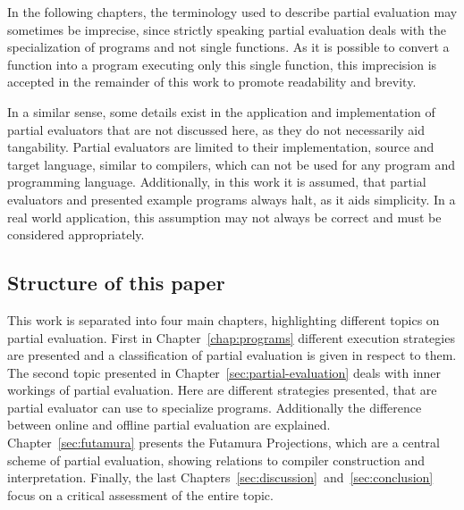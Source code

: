 In the following chapters, the terminology used to describe partial evaluation may sometimes be imprecise, since strictly speaking partial evaluation deals with the specialization of programs and not single functions.
As it is possible to convert a function into a program executing only this single function, this imprecision is accepted in the remainder of this work to promote readability and brevity.

In a similar sense, some details exist in the application and implementation of partial evaluators that are not discussed here, as they do not necessarily aid tangability.
Partial evaluators are limited to their implementation, source and target language, similar to compilers, which can not be used for any program and programming language.
Additionally, in this work it is assumed, that partial evaluators and presented example programs always halt, as it aids simplicity.
In a real world application, this assumption may not always be correct and must be considered appropriately.

\subsection{Structure of this paper}

This work is separated into four main chapters, highlighting different topics on partial evaluation.
First in Chapter~\ref{chap:programs} different execution strategies are presented and a classification of partial evaluation is given in respect to them.
The second topic presented in Chapter~\ref{sec:partial-evaluation} deals with inner workings of partial evaluation.
Here are different strategies presented, that are partial evaluator can use to specialize programs.
Additionally the difference between online and offline partial evaluation are explained.
Chapter~\ref{sec:futamura} presents the Futamura Projections, which are a central scheme of partial evaluation, showing relations to compiler construction and interpretation.
Finally, the last Chapters~\ref{sec:discussion}~and~\ref{sec:conclusion} focus on a critical assessment of the entire topic.

